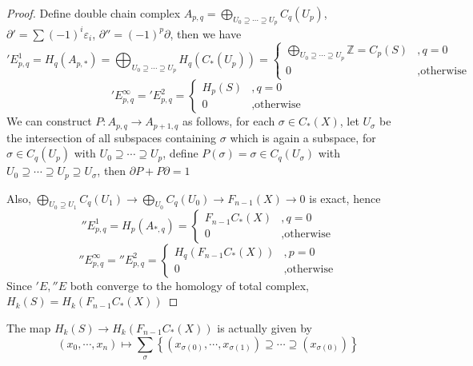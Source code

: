 \documentclass[../main.tex]{subfiles}
\begin{document}
\begin{proof}
Define double chain complex $\displaystyle A_{p,q}=\bigoplus_{U_0\supseteq\cdots\supseteq U_p}C_q(U_p)$, $\partial'=\sum(-1)^i\varepsilon_i$, $\partial''=(-1)^p\partial$, then we have
\['E^1_{p,q}=H_q(A_{p,*})=\bigoplus_{U_0\supseteq\cdots\supseteq U_p}H_q(C_*(U_p))=\begin{cases}
\displaystyle\bigoplus_{U_0\supseteq\cdots\supseteq U_p}\mathbb Z=C_p(S)&,q=0 \\
0&,\text{otherwise}
\end{cases}\]
\['E^\infty_{p,q}='E^2_{p,q}=\begin{cases}
H_p(S)&,q=0 \\
0&,\text{otherwise}
\end{cases}\]
We can construct $P:A_{p,q}\to A_{p+1,q}$ as follows, for each $\sigma\in C_*(X)$, let $U_\sigma$ be the intersection of all subspaces containing $\sigma$ which is again a subspace, for $\sigma\in C_q(U_p)$ with $U_0\supseteq\cdots\supseteq U_p$, define $P(\sigma)=\sigma\in C_q(U_\sigma)$ with $U_0\supseteq\cdots\supseteq U_p\supseteq U_\sigma$, then $\partial P+P\partial=1$
\begin{center}
\end{center}
Also, $\displaystyle\bigoplus_{U_0\supseteq U_1}C_q(U_1)\to\bigoplus_{U_0}C_q(U_0)\to F_{n-1}(X)\to0$ is exact, hence
\[''E^1_{p,q}=H_p(A_{*,q})=\begin{cases}
F_{n-1}C_*(X)&,q=0 \\
0&,\text{otherwise}
\end{cases}\]
\[''E^\infty_{p,q}=''E^2_{p,q}=\begin{cases}
H_q(F_{n-1}C_*(X))&,p=0 \\
0&,\text{otherwise}
\end{cases}\]
Since $'E,''E$ both converge to the homology of total complex, $H_k(S)=H_k(F_{n-1}C_*(X))$
\end{proof}

\begin{remark}
The map $H_k(S)\to H_k(F_{n-1}C_*(X))$ is actually given by
\[(x_0,\cdots,x_n)\mapsto\sum_{\sigma}\left\{\left(x_{\sigma(0)},\cdots,x_{\sigma(1)}\right)\supseteq\cdots\supseteq\left(x_{\sigma(0)}\right)\right\}\]
\end{remark}
\end{document}
